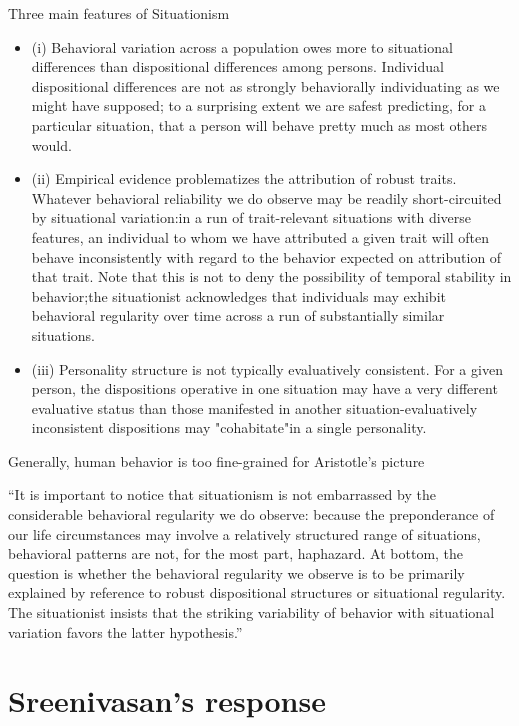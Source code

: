 \documentclass[11pt]{article}
\begin{document}
\noindent Three main features of Situationism

\begin{itemize}\item{(i) Behavioral variation across a population owes more to situational differences than dispositional differences among persons. Individual dispositional differences are not as strongly behaviorally individuating as we might have supposed; to a surprising extent we are safest predicting, for a particular situation, that a person will behave pretty much as most others would.}\item{(ii) Empirical evidence problematizes the attribution of robust traits. Whatever behavioral reliability we do observe may be readily short-circuited by situational variation:in a run of trait-relevant situations with diverse features, an individual to whom we have attributed a given trait will often behave inconsistently with regard to the behavior expected on attribution of that trait. Note that this is not to deny the possibility of temporal stability in behavior;the situationist acknowledges that individuals may exhibit behavioral regularity over time across a run of substantially similar situations.}\item{(iii) Personality structure is not typically evaluatively consistent. For a given person, the dispositions operative in one situation may have a very different evaluative status than those manifested in another situation-evaluatively inconsistent dispositions may "cohabitate"in a single personality.}\end{itemize}

\noindent Generally, human behavior is too fine-grained for Aristotle's picture
\vspace*{2mm}

\noindent ``It is important to notice that situationism is not embarrassed by the considerable behavioral regularity we do observe: because the preponderance of our life circumstances may involve a relatively structured range of situations, behavioral patterns are not, for the most part, haphazard. At bottom, the question is whether the behavioral regularity we observe is to be primarily explained by reference to robust dispositional structures or situational regularity. The situationist insists that the striking variability of behavior with situational variation favors the latter hypothesis.''

\section{Sreenivasan's response} 
\end{document}
